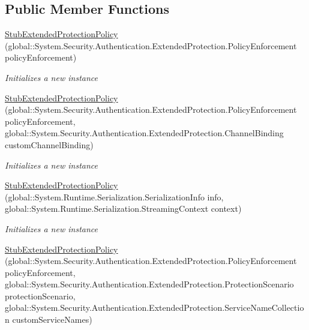 \subsection*{Public Member Functions}
\begin{DoxyCompactItemize}
\item 
\hyperlink{class_system_1_1_security_1_1_authentication_1_1_extended_protection_1_1_fakes_1_1_stub_extended_protection_policy_a44c1b1869f03f5489d6c3904c9794c71}{Stub\-Extended\-Protection\-Policy} (global\-::\-System.\-Security.\-Authentication.\-Extended\-Protection.\-Policy\-Enforcement policy\-Enforcement)
\begin{DoxyCompactList}\small\item\em Initializes a new instance\end{DoxyCompactList}\item 
\hyperlink{class_system_1_1_security_1_1_authentication_1_1_extended_protection_1_1_fakes_1_1_stub_extended_protection_policy_a42cd052058967aa836fbd815d6d1ab2c}{Stub\-Extended\-Protection\-Policy} (global\-::\-System.\-Security.\-Authentication.\-Extended\-Protection.\-Policy\-Enforcement policy\-Enforcement, global\-::\-System.\-Security.\-Authentication.\-Extended\-Protection.\-Channel\-Binding custom\-Channel\-Binding)
\begin{DoxyCompactList}\small\item\em Initializes a new instance\end{DoxyCompactList}\item 
\hyperlink{class_system_1_1_security_1_1_authentication_1_1_extended_protection_1_1_fakes_1_1_stub_extended_protection_policy_a46e8a17e5ac85e10741a14fde6f055c2}{Stub\-Extended\-Protection\-Policy} (global\-::\-System.\-Runtime.\-Serialization.\-Serialization\-Info info, global\-::\-System.\-Runtime.\-Serialization.\-Streaming\-Context context)
\begin{DoxyCompactList}\small\item\em Initializes a new instance\end{DoxyCompactList}\item 
\hyperlink{class_system_1_1_security_1_1_authentication_1_1_extended_protection_1_1_fakes_1_1_stub_extended_protection_policy_a6c16241b569a8e3faa7473e73a0fced2}{Stub\-Extended\-Protection\-Policy} (global\-::\-System.\-Security.\-Authentication.\-Extended\-Protection.\-Policy\-Enforcement policy\-Enforcement, global\-::\-System.\-Security.\-Authentication.\-Extended\-Protection.\-Protection\-Scenario protection\-Scenario, global\-::\-System.\-Security.\-Authentication.\-Extended\-Protection.\-Service\-Name\-Collection custom\-Service\-Names)

\end{DoxyCompactItemize}
